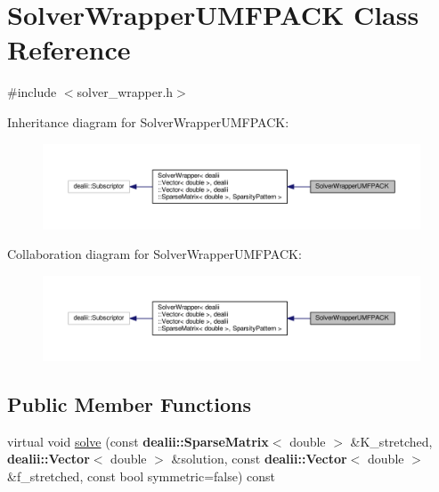 \hypertarget{class_solver_wrapper_u_m_f_p_a_c_k}{}\section{Solver\+Wrapper\+U\+M\+F\+P\+A\+CK Class Reference}
\label{class_solver_wrapper_u_m_f_p_a_c_k}


{\ttfamily \#include $<$solver\+\_\+wrapper.\+h$>$}



Inheritance diagram for Solver\+Wrapper\+U\+M\+F\+P\+A\+CK\+:\nopagebreak
\begin{figure}[H]
\begin{center}
\leavevmode
\includegraphics[width=350pt]{class_solver_wrapper_u_m_f_p_a_c_k__inherit__graph}
\end{center}
\end{figure}


Collaboration diagram for Solver\+Wrapper\+U\+M\+F\+P\+A\+CK\+:\nopagebreak
\begin{figure}[H]
\begin{center}
\leavevmode
\includegraphics[width=350pt]{class_solver_wrapper_u_m_f_p_a_c_k__coll__graph}
\end{center}
\end{figure}
\subsection*{Public Member Functions}
\begin{DoxyCompactItemize}
\item 
virtual void \hyperlink{class_solver_wrapper_u_m_f_p_a_c_k_a80ed8c6186251e670960945e9ebc0c5b}{solve} (const {\bf dealii\+::\+Sparse\+Matrix}$<$ double $>$ \&K\+\_\+stretched, {\bf dealii\+::\+Vector}$<$ double $>$ \&solution, const {\bf dealii\+::\+Vector}$<$ double $>$ \&f\+\_\+stretched, const bool symmetric=false) const 
\end{DoxyCompactItemize}


